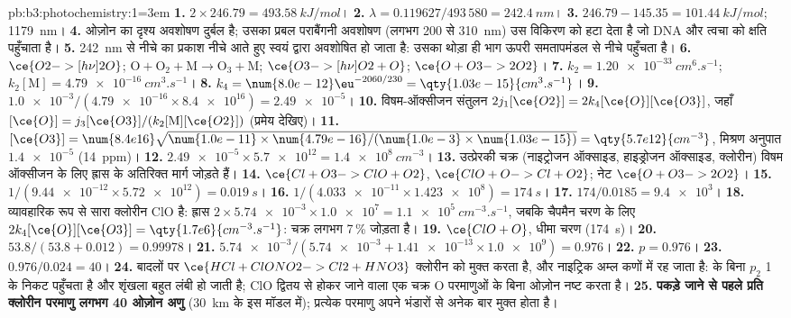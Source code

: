 \begin{solution}{pb:b3:photochemistry:1}\emergencystretch=3em
\textbf{1.} $2 \times 246.79 = \qty{493.58}{kJ/mol}$।
\textbf{2.} $\lambda = 0.119627/493\,580 = \qty{242.4}{nm}$।
\textbf{3.} $246.79 - 145.35 = \qty{101.44}{kJ/mol}$; \qty{1179}{nm}।
\textbf{4.} ओज़ोन का दृश्य अवशोषण दुर्बल है; उसका प्रबल पराबैंगनी अवशोषण
(लगभग 200 से \qty{310}{nm}) उस विकिरण को हटा देता है जो DNA और त्वचा को क्षति पहुँचाता है।
\textbf{5.} \qty{242}{nm} से नीचे का प्रकाश नीचे आते हुए स्वयं  द्वारा अवशोषित हो जाता है: उसका थोड़ा ही भाग
ऊपरी समतापमंडल से नीचे पहुँचता है।
\textbf{6.} $\ce{O2 ->[h\nu] 2 O}$; $\mathrm{O + O_2 + M \to O_3 + M}$; $\ce{O3 ->[h\nu] O2 + O}$; $\ce{O + O3 -> 2 O2}$।
\textbf{7.} $k_2 = \qty{1.20e-33}{cm^6.s^{-1}}$; $k_2[\mathrm M] = \qty{4.79e-16}{cm^3.s^{-1}}$।
\textbf{8.} $k_4 = \num{8.0e-12}\eu^{-2060/230} = \qty{1.03e-15}{cm^3.s^{-1}}$।
\textbf{9.} $\num{1.0e-3}/(\num{4.79e-16} \times \num{8.4e16}) = \num{2.49e-5}$।
\textbf{10.} विषम-ऑक्सीजन संतुलन $2j_1[\ce{O2}] = 2k_4[\ce{O}][\ce{O3}]$, जहाँ $[\ce{O}] = j_3[\ce{O3}]/(k_2[\mathrm M][\ce{O2}])$ (प्रमेय
देखिए)।
\textbf{11.} $[\ce{O3}] = \num{8.4e16}\sqrt{\num{1.0e-11} \times \num{4.79e-16}/(\num{1.0e-3} \times \num{1.03e-15})} =
\qty{5.7e12}{cm^{-3}}$, मिश्रण अनुपात $\num{1.4e-5}$ (\qty{14}{ppm})।
\textbf{12.} $\num{2.49e-5} \times \num{5.7e12} = \qty{1.4e8}{cm^{-3}}$।
\textbf{13.} उत्प्रेरकी चक्र (नाइट्रोजन ऑक्साइड, हाइड्रोजन ऑक्साइड, क्लोरीन) विषम ऑक्सीजन के लिए
ह्रास के अतिरिक्त मार्ग जोड़ते हैं।
\textbf{14.} $\ce{Cl + O3 -> ClO + O2}$, $\ce{ClO + O -> Cl + O2}$; नेट $\ce{O + O3 -> 2 O2}$।
\textbf{15.} $1/(\num{9.44e-12} \times \num{5.72e12}) = \qty{0.019}{s}$।
\textbf{16.} $1/(\num{4.033e-11} \times \num{1.423e8}) = \qty{174}{s}$।
\textbf{17.} $174/0.0185 = \num{9.4e3}$।
\textbf{18.} व्यावहारिक रूप से सारा क्लोरीन ClO है: ह्रास $2 \times \num{5.74e-3} \times \num{1.0e7} = \qty{1.1e5}{cm^{-3}.s^{-1}}$,
जबकि चैपमैन चरण के लिए $2k_4[\ce{O}][\ce{O3}] = \qty{1.7e6}{cm^{-3}.s^{-1}}$: चक्र लगभग
7\,\% जोड़ता है।
\textbf{19.} $\ce{ClO + O}$, धीमा चरण (\qty{174}{s})।
\textbf{20.} $53.8/(53.8 + 0.012) = 0.99978$।
\textbf{21.} $\num{5.74e-3}/(\num{5.74e-3} + \num{1.41e-13} \times \num{1.0e9}) = 0.976$।
\textbf{22.} $p = 0.976$।
\textbf{23.} $0.976/0.024 = 40$।
\textbf{24.} बादलों पर $\ce{HCl + ClONO2 -> Cl2 + HNO3}$ क्लोरीन को मुक्त करता है, और नाइट्रिक अम्ल
कणों में रह जाता है:  के बिना $p_2$ 1 के निकट पहुँचता है और शृंखला
बहुत लंबी हो जाती है; ClO द्वितय से होकर जाने वाला एक चक्र O परमाणुओं के बिना ओज़ोन नष्ट करता है।
\textbf{25.} \textbf{पकड़े जाने से पहले प्रति क्लोरीन परमाणु लगभग 40 ओज़ोन अणु} (\qty{30}{km}
के इस मॉडल में); प्रत्येक परमाणु अपने भंडारों से अनेक बार मुक्त होता है।
\end{solution}
